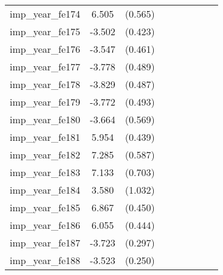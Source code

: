 {\begin{tabular}{l*{4}{cc}}
imp\_year\_fe174&    6.505\sym{***}&  (0.565)&                  &         &                  &         &                  &         \\
imp\_year\_fe175&   -3.502\sym{***}&  (0.423)&                  &         &                  &         &                  &         \\
imp\_year\_fe176&   -3.547\sym{***}&  (0.461)&                  &         &                  &         &                  &         \\
imp\_year\_fe177&   -3.778\sym{***}&  (0.489)&                  &         &                  &         &                  &         \\
imp\_year\_fe178&   -3.829\sym{***}&  (0.487)&                  &         &                  &         &                  &         \\
imp\_year\_fe179&   -3.772\sym{***}&  (0.493)&                  &         &                  &         &                  &         \\
imp\_year\_fe180&   -3.664\sym{***}&  (0.569)&                  &         &                  &         &                  &         \\
imp\_year\_fe181&    5.954\sym{***}&  (0.439)&                  &         &                  &         &                  &         \\
imp\_year\_fe182&    7.285\sym{***}&  (0.587)&                  &         &                  &         &                  &         \\
imp\_year\_fe183&    7.133\sym{***}&  (0.703)&                  &         &                  &         &                  &         \\
imp\_year\_fe184&    3.580\sym{***}&  (1.032)&                  &         &                  &         &                  &         \\
imp\_year\_fe185&    6.867\sym{***}&  (0.450)&                  &         &                  &         &                  &         \\
imp\_year\_fe186&    6.055\sym{***}&  (0.444)&                  &         &                  &         &                  &         \\
imp\_year\_fe187&   -3.723\sym{***}&  (0.297)&                  &         &                  &         &                  &         \\
imp\_year\_fe188&   -3.523\sym{***}&  (0.250)&                  &         &                  &         &                  &         \\

\end{tabular}}
